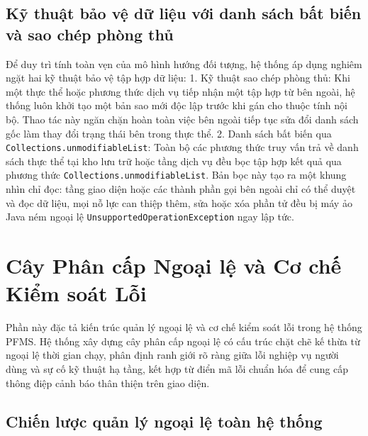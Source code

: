 \documentclass[a4paper,12pt]{report}
\newcommand{\passthrough}[1]{#1}
\begin{document}
\section{Kỹ thuật bảo vệ dữ liệu với danh sách bất biến và sao chép
phòng
thủ}\label{kux1ef9-thuux1eadt-bux1ea3o-vux1ec7-dux1eef-liux1ec7u-vux1edbi-danh-suxe1ch-bux1ea5t-biux1ebfn-vuxe0-sao-chuxe9p-phuxf2ng-thux1ee7}

Để duy trì tính toàn vẹn của mô hình hướng đối tượng, hệ thống áp dụng
nghiêm ngặt hai kỹ thuật bảo vệ tập hợp dữ liệu: 1. Kỹ thuật sao chép
phòng thủ: Khi một thực thể hoặc phương thức dịch vụ tiếp nhận một tập
hợp từ bên ngoài, hệ thống luôn khởi tạo một bản sao mới độc lập trước
khi gán cho thuộc tính nội bộ. Thao tác này ngăn chặn hoàn toàn việc bên
ngoài tiếp tục sửa đổi danh sách gốc làm thay đổi trạng thái bên trong
thực thể. 2. Danh sách bất biến qua
\passthrough{\lstinline!Collections.unmodifiableList!}: Toàn bộ các
phương thức truy vấn trả về danh sách thực thể tại kho lưu trữ hoặc tầng
dịch vụ đều bọc tập hợp kết quả qua phương thức
\passthrough{\lstinline!Collections.unmodifiableList!}. Bản bọc này tạo
ra một khung nhìn chỉ đọc: tầng giao diện hoặc các thành phần gọi bên
ngoài chỉ có thể duyệt và đọc dữ liệu, mọi nỗ lực can thiệp thêm, sửa
hoặc xóa phần tử đều bị máy ảo Java ném ngoại lệ
\passthrough{\lstinline!UnsupportedOperationException!} ngay lập tức.

\chapter{Cây Phân cấp Ngoại lệ và Cơ chế Kiểm soát
Lỗi}\label{cuxe2y-phuxe2n-cux1ea5p-ngoux1ea1i-lux1ec7-vuxe0-cux1a1-chux1ebf-kiux1ec3m-souxe1t-lux1ed7i}

Phần này đặc tả kiến trúc quản lý ngoại lệ và cơ chế kiểm soát lỗi trong
hệ thống PFMS. Hệ thống xây dựng cây phân cấp ngoại lệ có cấu trúc chặt
chẽ kế thừa từ ngoại lệ thời gian chạy, phân định ranh giới rõ ràng giữa
lỗi nghiệp vụ người dùng và sự cố kỹ thuật hạ tầng, kết hợp từ điển mã
lỗi chuẩn hóa để cung cấp thông điệp cảnh báo thân thiện trên giao diện.

\section{Chiến lược quản lý ngoại lệ toàn hệ
thống}\label{chiux1ebfn-lux1b0ux1ee3c-quux1ea3n-luxfd-ngoux1ea1i-lux1ec7-touxe0n-hux1ec7-thux1ed1ng}
\end{document}
